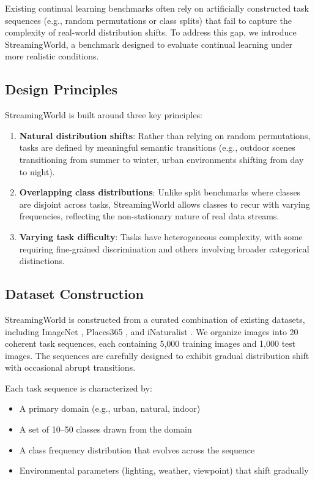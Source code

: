 \documentclass[11pt]{article}
\begin{document}
Existing continual learning benchmarks often rely on artificially constructed task sequences (e.g., random permutations or class splits) that fail to capture the complexity of real-world distribution shifts. To address this gap, we introduce StreamingWorld, a benchmark designed to evaluate continual learning under more realistic conditions.

\subsection{Design Principles}

StreamingWorld is built around three key principles:
\begin{enumerate}
    \item \textbf{Natural distribution shifts}: Rather than relying on random permutations, tasks are defined by meaningful semantic transitions (e.g., outdoor scenes transitioning from summer to winter, urban environments shifting from day to night).
    \item \textbf{Overlapping class distributions}: Unlike split benchmarks where classes are disjoint across tasks, StreamingWorld allows classes to recur with varying frequencies, reflecting the non-stationary nature of real data streams.
    \item \textbf{Varying task difficulty}: Tasks have heterogeneous complexity, with some requiring fine-grained discrimination and others involving broader categorical distinctions.
\end{enumerate}

\subsection{Dataset Construction}

StreamingWorld is constructed from a curated combination of existing datasets, including ImageNet \citep{deng2009imagenet}, Places365 \citep{zhou2017places}, and iNaturalist \citep{van2018inaturalist}. We organize images into 20 coherent task sequences, each containing 5,000 training images and 1,000 test images. The sequences are carefully designed to exhibit gradual distribution shift with occasional abrupt transitions.

Each task sequence is characterized by:
\begin{itemize}
    \item A primary domain (e.g., urban, natural, indoor)
    \item A set of 10--50 classes drawn from the domain
    \item A class frequency distribution that evolves across the sequence
    \item Environmental parameters (lighting, weather, viewpoint) that shift gradually
\end{itemize}
\end{document}
